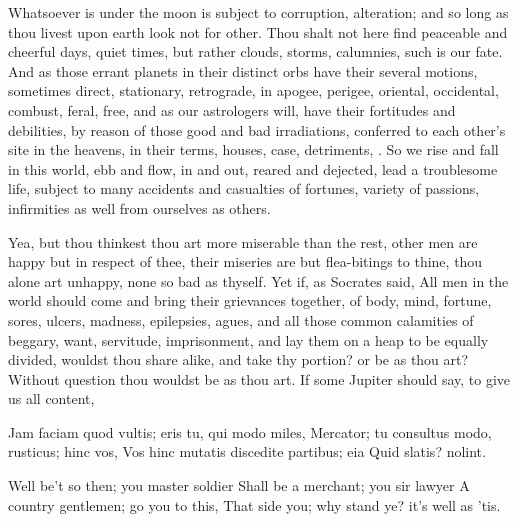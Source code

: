 {Whatsoever is under the moon is subject to corruption, alteration; and
so long as thou livest upon earth look not for other. Thou shalt
not here find peaceable and cheerful days, quiet times, but rather
clouds, storms, calumnies, such is our fate. And as those errant
planets in their distinct orbs have their several motions, sometimes
direct, stationary, retrograde, in apogee, perigee, oriental,
occidental, combust, feral, free, and as our astrologers will, have
their fortitudes and debilities, by reason of those good and bad
irradiations, conferred to each other's site in the heavens, in their
terms, houses, case, detriments, \etc{}. So we rise and fall in this world,
ebb and flow, in and out, reared and dejected, lead a troublesome life,
subject to many accidents and casualties of fortunes, variety of
passions, infirmities as well from ourselves as others.

Yea, but thou thinkest thou art more miserable than the rest, other men
are happy but in respect of thee, their miseries are but flea-bitings
to thine, thou alone art unhappy, none so bad as thyself. Yet if, as
Socrates said, All men in the world should come and bring their
grievances together, of body, mind, fortune, sores, ulcers, madness,
epilepsies, agues, and all those common calamities of beggary, want,
servitude, imprisonment, and lay them on a heap to be equally divided,
wouldst thou share alike, and take thy portion? or be as thou art?
Without question thou wouldst be as thou art. If some Jupiter should
say, to give us all content,

Jam faciam quod vultis; eris tu, qui modo miles,
Mercator; tu consultus modo, rusticus; hinc vos,
Vos hinc mutatis discedite partibus; eia
Quid slatis? nolint.

Well be't so then; you master soldier
Shall be a merchant; you sir lawyer
A country gentlemen; go you to this,
That side you; why stand ye? it's well as 'tis.

}
